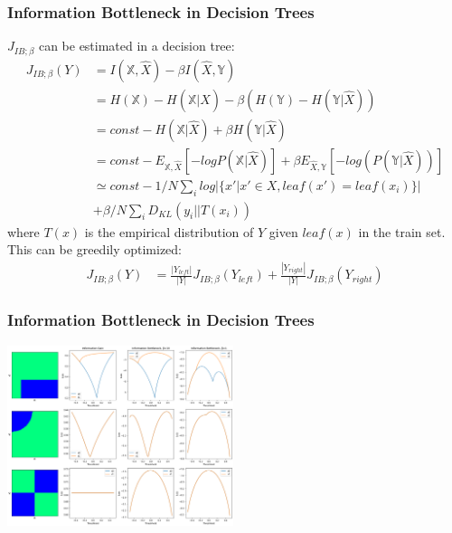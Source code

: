 \begin{frame}
    \frametitle{Information Bottleneck in Decision Trees}


    $J_{IB;\beta}$ can be estimated in a decision tree:
    \begin{align*}
        J_{IB;\beta}(Y) &= I(\mathbb{X}, \hat{X}) - \beta I(\hat{X}, \mathbb{Y}) \\
        &= H(\mathbb{X}) - H(\mathbb{X}|\hat{X}) - \beta (H(\mathbb{Y}) - H(\mathbb{Y} | \hat{X})) \\
        &= const - H(\mathbb{X}|\hat{X}) + \beta H(\mathbb{Y} | \hat{X}) \\
        &= const - E_{\mathbb{X},\hat{X}}[-log P(\mathbb{X}|\hat{X})] + \beta E_{\hat{X},\mathbb{Y}}[-log(P(\mathbb{Y}|\hat{X}))] \\
        & \simeq const - 1/N \sum_i log |\{x' |x' \in X, leaf(x')=leaf(x_i)\}| \\
        &+ \beta /N \sum_i D_{KL}(y_i|| T(x_i))
        \label{eq:2}
    \end{align*}
    where $T(x)$ is the empirical distribution of $Y$ given $leaf(x)$ in the train set. \newline
    This can be greedily optimized:
    \begin{align*}
        J_{IB;\beta}(Y) &= \frac{|Y_{left}|}{|Y|} J_{IB;\beta}(Y_{left}) + \frac{|Y_{right}|}{|Y|} J_{IB;\beta}(Y_{right})
    \end{align*}
\end{frame}


\begin{frame}
    \frametitle{Information Bottleneck in Decision Trees}
    \begin{center}
        \includegraphics[width=250px]{img/optimal_split_comparison.png}
    \end{center}
\end{frame}



